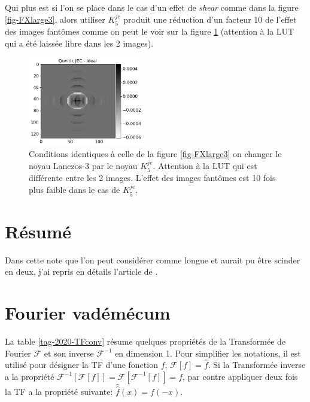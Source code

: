 \documentclass[11pt,twoside]{article}
\begin{document}
Qui plus est si l'on se place dans le cas d'un effet de \textit{shear} comme dans la figure \ref{fig-FXlarge3}, alors utiliser $K_5^{je}$ produit une réduction d'un facteur 10 de l'effet des images fantômes comme on peut le voir sur la figure \ref{fig-FXlarge-shear-QuniticJE} (attention à la LUT qui a été laissée libre dans les 2 images).
\begin{figure}
\centering
\includegraphics[width=0.45\textwidth]{fig27.png}
\caption{Conditions identiques à celle de la figure \ref{fig-FXlarge3} on changer le noyau Lanczos-3 par le noyau $K_5^{je}$. Attention à la LUT qui est différente entre les 2 images. L'effet des images fantômes est 10 fois plus faible dans le cas de $K_5^{je}$.}
\label{fig-FXlarge-shear-QuniticJE}
\end{figure}
%
\section{Résumé}
% 
Dans cette note que l'on peut considérer comme longue et aurait pu être scinder en deux, j'ai repris en détails l'article de \cite{2014PASP..126..287B}.
\newpage
{}


\newpage
\appendix
\section{Fourier vadémécum}
La table \ref{tag-2020-TFconv} résume quelques propriétés de la Transformée de Fourier $\mathcal{F}$ et son inverse $\mathcal{F}^{-1}$ en dimension 1. Pour simplifier les notations, il est utilisé pour désigner la TF d'une fonction $f$, $\mathcal{F}[f] = \hat{f}$. Si la Transformée inverse a la propriété $\mathcal{F}^{-1}[\mathcal{F}[f]]= \mathcal{F}[\mathcal{F}^{-1}[f]]=f$, par contre appliquer deux fois la TF a la propriété suivante: $\hat{\hat{f}}(x) = f(-x)$.
\end{document}
